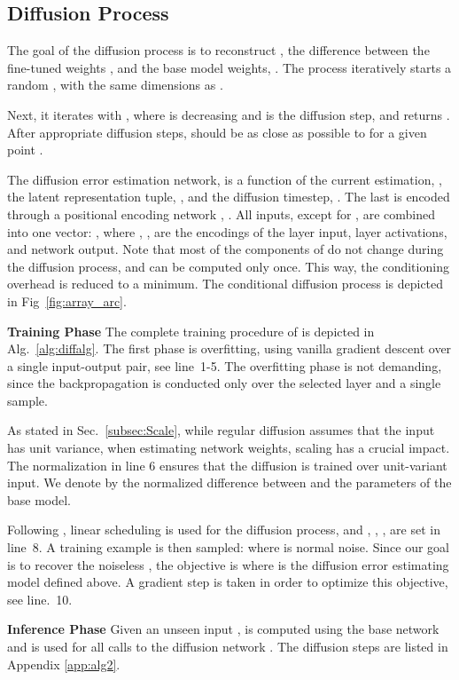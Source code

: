 \documentclass{article}
\theoremstyle{plain}
\begin{document}
\subsection{Diffusion Process}

The goal of the diffusion process is to reconstruct , the difference between the fine-tuned weights , and the base model weights, .
The process iteratively starts a random , with the same dimensions as . 

Next, it iterates with , where  is decreasing and is the diffusion step, and returns . After appropriate diffusion steps,  should be as close as possible to  for a given point .

The diffusion error estimation network,  is a function of the current estimation, , the latent representation tuple, , and the diffusion timestep, . The last is encoded through a positional encoding network \citep{attention_is_all_u_need}, . All inputs, except for ,  are combined into one vector: , where , ,  are the encodings of the layer input, layer activations, and network output. Note that most of the components of  do not change during the diffusion process, and can be computed only once. This way, the conditioning overhead is reduced to a minimum. The conditional diffusion process is depicted in Fig~\ref{fig:array_arc}.




{\bf Training Phase\quad} The complete training procedure of  is depicted in Alg.~\ref{alg:diffalg}. The first phase is overfitting, using vanilla gradient descent over a single input-output pair, see line~1-5. The overfitting phase is not demanding, since the backpropagation is conducted only over the selected layer and a single sample. 


As stated in Sec.~\ref{subsec:Scale}, while regular diffusion assumes that the input has unit variance, when estimating network weights, scaling has a crucial impact. The normalization in line 6 ensures that the diffusion is trained over unit-variant input. We denote by  the normalized difference between  and the parameters  of the base model.

Following \citet{ddim}, linear scheduling is used for the diffusion process, and , , ,  are set in line~8. A training example is then sampled:
 where  is normal noise. Since our goal is to recover the noiseless , the objective is
 where  is the diffusion error estimating model defined above. A gradient step is taken in order to optimize this objective, see line.~10.

{\bf Inference Phase\quad} Given an unseen input ,  is computed using the base network  and is used for all calls to the diffusion network . The diffusion steps are listed in Appendix \ref{app:alg2}.
\end{document}
